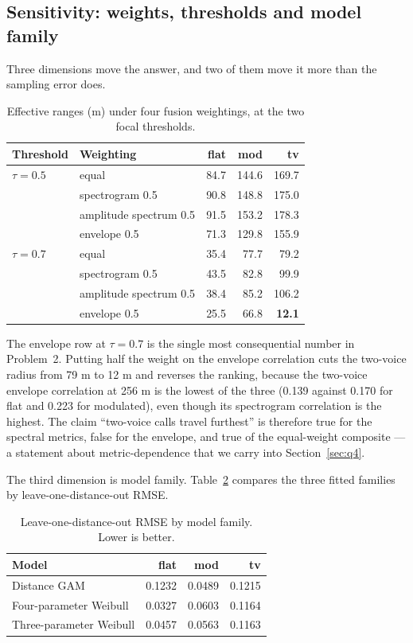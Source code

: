 \subsection{Sensitivity: weights, thresholds and model family}\label{sec:q2-sens}

Three dimensions move the answer, and two of them move it more than the sampling error does.

\begin{table}[htbp]
  \centering
  \caption{Effective ranges (m) under four fusion weightings, at the two focal thresholds.}\label{tab:q2-sens}
  \small
  \begin{tabular}{llrrr}
    \toprule
    Threshold & Weighting & flat & mod & tv \\
    \midrule
    $\tau=0.5$ & equal & 84.7 & 144.6 & 169.7 \\
               & spectrogram 0.5 & 90.8 & 148.8 & 175.0 \\
               & amplitude spectrum 0.5 & 91.5 & 153.2 & 178.3 \\
               & envelope 0.5 & 71.3 & 129.8 & 155.9 \\
    \midrule
    $\tau=0.7$ & equal & 35.4 & 77.7 & 79.2 \\
               & spectrogram 0.5 & 43.5 & 82.8 & 99.9 \\
               & amplitude spectrum 0.5 & 38.4 & 85.2 & 106.2 \\
               & envelope 0.5 & 25.5 & 66.8 & \textbf{12.1} \\
    \bottomrule
  \end{tabular}
\end{table}

The envelope row at $\tau=0.7$ is the single most consequential number in Problem~2. Putting half
the weight on the envelope correlation cuts the two-voice radius from 79 m to 12 m and reverses
the ranking, because the two-voice envelope correlation at 256 m is the lowest of the three
(0.139 against 0.170 for flat and 0.223 for modulated), even though its spectrogram correlation
is the highest. The claim ``two-voice calls travel furthest'' is therefore true for the spectral
metrics, false for the envelope, and true of the equal-weight composite — a statement about
metric-dependence that we carry into Section~\ref{sec:q4}.

The third dimension is model family. Table~\ref{tab:q2-models} compares the three fitted
families by leave-one-distance-out RMSE.

\begin{table}[htbp]
  \centering
  \caption{Leave-one-distance-out RMSE by model family. Lower is better.}\label{tab:q2-models}
  \small
  \begin{tabular}{lrrr}
    \toprule
    Model & flat & mod & tv \\
    \midrule
    Distance GAM & 0.1232 & 0.0489 & 0.1215 \\
    Four-parameter Weibull & 0.0327 & 0.0603 & 0.1164 \\
    Three-parameter Weibull & 0.0457 & 0.0563 & 0.1163 \\
    \bottomrule
  \end{tabular}
\end{table}

